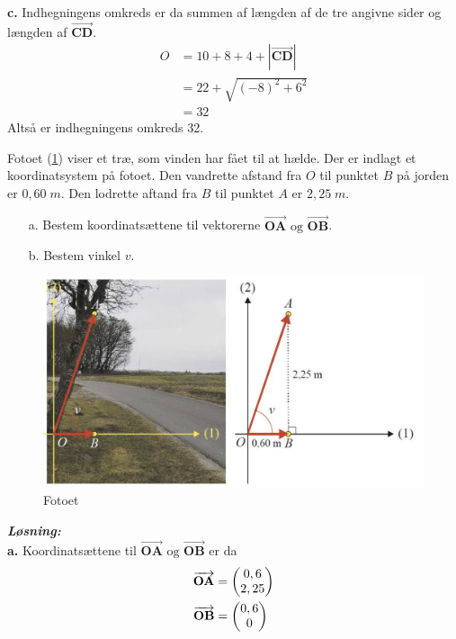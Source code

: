 \documentclass{article}
\newcommand{\sol}{\setlength{\parindent}{0cm}\textbf{\textit{Løsning:}}\setlength{\parindent}{1cm}}
\begin{document}
\textbf{c.}
Indhegningens omkreds er da summen af længden af de tre angivne sider og længden af $\overrightarrow{\textbf{CD}} $.
\begin{equation*}
\begin{split}
  O&=10+8+4+\left| \overrightarrow{\textbf{CD}}  \right| \\ 
  &=22+\sqrt{\left(-8\right)^2+6^2} \\ 
  &= 32
\end{split}
  \end{equation*}
Altså er indhegningens omkreds 32.
\begin{question}{}{}
  Fotoet (\cref{fig:foto}) viser et træ, som vinden har fået til at hælde.
  Der er indlagt et koordinatsystem på fotoet.
  Den vandrette afstand fra $O$ til punktet $B$ på jorden er $0,60 \;\unit{m} $.
  Den lodrette aftand fra $B$ til punktet $A$ er $2,25 \;\unit{m} $.
  \begin{itemize}
    \item[a.] Bestem koordinatsættene til vektorerne $\overrightarrow{\textbf{OA}} \text{ og } \overrightarrow{\textbf{OB}} $.
    \item[b.] Bestem vinkel $v$.
  \end{itemize}
\end{question}
\begin{figure}[H]
\begin{center}
  \includegraphics[scale=0.5]{foto.png}
\end{center}
\caption{Fotoet}
\label{fig:foto}
\end{figure}
\sol \\
\textbf{a.}
Koordinatsættene til $\overrightarrow{\textbf{OA}} \text{ og } \overrightarrow{\textbf{OB}} $ er da
\begin{equation*}
\begin{split}
  \overrightarrow{\textbf{OA}} &=\mqty(0,6\\ 2,25) \\ 
  \overrightarrow{\textbf{OB}} &=\mqty(0,6\\ 0) 
\end{split}
\end{equation*}
\end{document}
